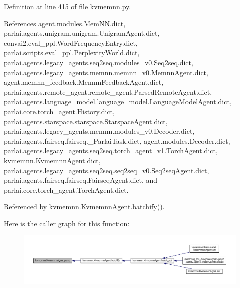 Definition at line 415 of file kvmemnn.\+py.



References agent.\+modules.\+Mem\+N\+N.\+dict, parlai.\+agents.\+unigram.\+unigram.\+Unigram\+Agent.\+dict, convai2.\+eval\+\_\+ppl.\+Word\+Frequency\+Entry.\+dict, parlai.\+scripts.\+eval\+\_\+ppl.\+Perplexity\+World.\+dict, parlai.\+agents.\+legacy\+\_\+agents.\+seq2seq.\+modules\+\_\+v0.\+Seq2seq.\+dict, parlai.\+agents.\+legacy\+\_\+agents.\+memnn.\+memnn\+\_\+v0.\+Memnn\+Agent.\+dict, agent.\+memnn\+\_\+feedback.\+Memnn\+Feedback\+Agent.\+dict, parlai.\+agents.\+remote\+\_\+agent.\+remote\+\_\+agent.\+Parsed\+Remote\+Agent.\+dict, parlai.\+agents.\+language\+\_\+model.\+language\+\_\+model.\+Language\+Model\+Agent.\+dict, parlai.\+core.\+torch\+\_\+agent.\+History.\+dict, parlai.\+agents.\+starspace.\+starspace.\+Starspace\+Agent.\+dict, parlai.\+agents.\+legacy\+\_\+agents.\+memnn.\+modules\+\_\+v0.\+Decoder.\+dict, parlai.\+agents.\+fairseq.\+fairseq.\+\_\+\+Parlai\+Task.\+dict, agent.\+modules.\+Decoder.\+dict, parlai.\+agents.\+legacy\+\_\+agents.\+seq2seq.\+torch\+\_\+agent\+\_\+v1.\+Torch\+Agent.\+dict, kvmemnn.\+Kvmemnn\+Agent.\+dict, parlai.\+agents.\+legacy\+\_\+agents.\+seq2seq.\+seq2seq\+\_\+v0.\+Seq2seq\+Agent.\+dict, parlai.\+agents.\+fairseq.\+fairseq.\+Fairseq\+Agent.\+dict, and parlai.\+core.\+torch\+\_\+agent.\+Torch\+Agent.\+dict.



Referenced by kvmemnn.\+Kvmemnn\+Agent.\+batchify().

Here is the caller graph for this function\+:
\nopagebreak
\begin{figure}[H]
\begin{center}
\leavevmode
\includegraphics[width=350pt]{classkvmemnn_1_1KvmemnnAgent_ab29b337013bf1b4f5c33162c84f6528e_icgraph}
\end{center}
\end{figure}
\mbox{\label{classkvmemnn_1_1KvmemnnAgent_ac2b07b1455920e6a343271997b9c6207}} 
